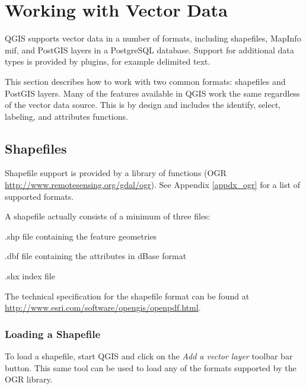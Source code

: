 \chapter{Working with Vector Data}
QGIS supports vector data in a number of formats, including shapefiles,
MapInfo mif, and PostGIS layers in a PostgreSQL database. Support for
additional data types is provided by plugins, for example delimited
text.

This section describes how to work with two common formats:
shapefiles and PostGIS layers. Many of the
features available in QGIS work the same regardless of the vector data source.
This is by design and includes the identify, select, labeling, and attributes
functions.

\section{Shapefiles}
Shapefile support is provided by a library of functions (OGR
\url{http://www.remotesensing.org/gdal/ogr}). See Appendix \ref{appdx_ogr} for a list of supported formats.

A shapefile actually consists of a minimum of three
files:
\begin{compactenum}
\item .shp file containing the feature geometries
\item .dbf file containing the attributes in dBase format
\item .shx index file
\end{compactenum}
The technical specification for the shapefile format can be found at\\
\url{http://www.esri.com/software/opengis/openpdf.html}.
\subsection{Loading a Shapefile}
To load a
shapefile, start QGIS and click on the \textit{Add a vector layer} toolbar bar
button. This same tool can be used to load any of the formats supported by the OGR library.

